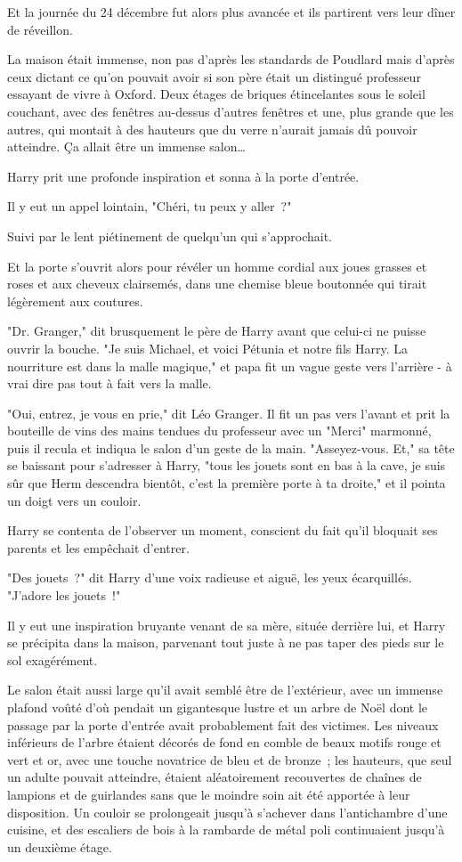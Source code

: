 Et la journée du 24 décembre fut alors plus avancée et ils partirent vers leur dîner de réveillon.

\later

La maison était immense, non pas d'après les standards de Poudlard mais d'après ceux dictant ce qu'on pouvait avoir si son père était un distingué professeur essayant de vivre à Oxford. Deux étages de briques étincelantes sous le soleil couchant, avec des fenêtres au-dessus d'autres fenêtres et une, plus grande que les autres, qui montait à des hauteurs que du verre n'aurait jamais dû pouvoir atteindre. Ça allait être un immense salon…

Harry prit une profonde inspiration et sonna à la porte d'entrée.

Il y eut un appel lointain, "Chéri, tu peux y aller~?"

Suivi par le lent piétinement de quelqu'un qui s'approchait.

Et la porte s'ouvrit alors pour révéler un homme cordial aux joues grasses et roses et aux cheveux clairsemés, dans une chemise bleue boutonnée qui tirait légèrement aux coutures.

"Dr. Granger," dit brusquement le père de Harry avant que celui-ci ne puisse ouvrir la bouche. "Je suis Michael, et voici Pétunia et notre fils Harry. La nourriture est dans la malle magique," et papa fit un vague geste vers l'arrière - à vrai dire pas tout à fait vers la malle.

"Oui, entrez, je vous en prie," dit Léo Granger. Il fit un pas vers l'avant et prit la bouteille de vins des mains tendues du professeur avec un "Merci" marmonné, puis il recula et indiqua le salon d'un geste de la main. "Asseyez-vous. Et," sa tête se baissant pour s'adresser à Harry, "tous les jouets sont en bas à la cave, je suis sûr que Herm descendra bientôt, c'est la première porte à ta droite," et il pointa un doigt vers un couloir.

Harry se contenta de l'observer un moment, conscient du fait qu'il bloquait ses parents et les empêchait d'entrer.

"Des jouets~?" dit Harry d'une voix radieuse et aiguë, les yeux écarquillés. "J'adore les jouets~!"

Il y eut une inspiration bruyante venant de sa mère, située derrière lui, et Harry se précipita dans la maison, parvenant tout juste à ne pas taper des pieds sur le sol exagérément.

Le salon était aussi large qu'il avait semblé être de l'extérieur, avec un immense plafond voûté d'où pendait un gigantesque lustre et un arbre de Noël dont le passage par la porte d'entrée avait probablement fait des victimes. Les niveaux inférieurs de l'arbre étaient décorés de fond en comble de beaux motifs rouge et vert et or, avec une touche novatrice de bleu et de bronze~; les hauteurs, que seul un adulte pouvait atteindre, étaient aléatoirement recouvertes de chaînes de lampions et de guirlandes sans que le moindre soin ait été apportée à leur disposition. Un couloir se prolongeait jusqu'à s'achever dans l'antichambre d'une cuisine, et des escaliers de bois à la rambarde de métal poli continuaient jusqu'à un deuxième étage.

